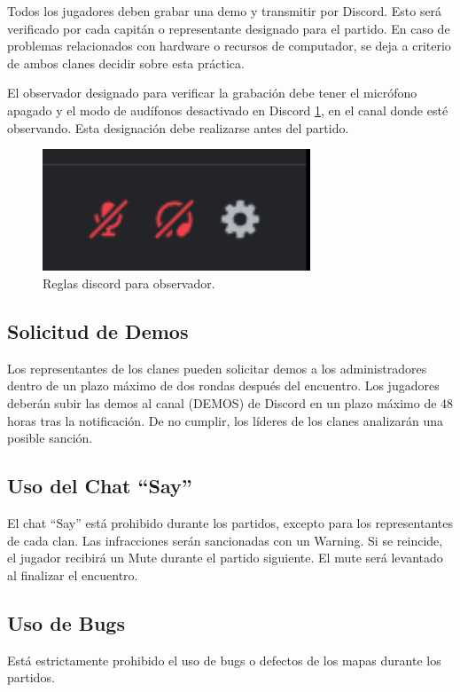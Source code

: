 \documentclass[a4paper, 11pt]{article}
\begin{document}
Todos los jugadores deben grabar una demo y transmitir por Discord. Esto será verificado por cada capitán o representante designado para el partido. En caso de problemas relacionados con hardware o recursos de computador, se deja a criterio de ambos clanes decidir sobre esta práctica.

El observador designado para verificar la grabación debe tener el micrófono apagado y el modo de audífonos desactivado en Discord \ref{fig:discord}, en el canal donde esté observando. Esta designación debe realizarse antes del partido.

\begin{figure}[htb]
    \centering
    \includegraphics[width=8cm]{img/discord.png}
    \caption{Reglas discord para observador.}
    \label{fig:discord}
\end{figure} 

    \subsection{Solicitud de Demos}
    Los representantes de los clanes pueden solicitar demos a los administradores dentro de un plazo máximo de dos rondas después del encuentro. Los jugadores deberán subir las demos al canal (DEMOS) de Discord en un plazo máximo de 48 horas tras la notificación. De no cumplir, los líderes de los clanes analizarán una posible sanción.

    \subsection{Uso del Chat “Say”}
    El chat “Say” está prohibido durante los partidos, excepto para los representantes de cada clan. Las infracciones serán sancionadas con un Warning. Si se reincide, el jugador recibirá un Mute durante el partido siguiente. El mute será levantado al finalizar el encuentro.

    \subsection{Uso de Bugs}
    Está estrictamente prohibido el uso de bugs o defectos de los mapas durante los partidos.
\end{document}
